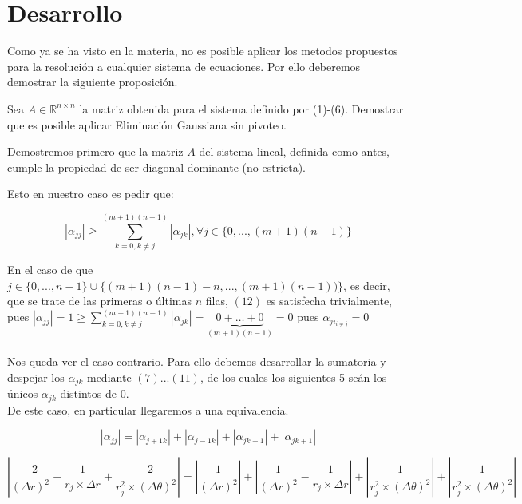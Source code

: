 \section{Desarrollo}

Como ya se ha visto en la materia, no es posible aplicar los metodos propuestos para la resoluci\'on a cualquier sistema de ecuaciones. Por ello deberemos demostrar la siguiente proposici\'on.

\begin{proposition}
Sea $A \in \mathbb{R}^{n \times n}$ la matriz obtenida para el sistema definido por (1)-(6). Demostrar que es posible
aplicar Eliminaci\'on Gaussiana sin pivoteo.
\end{proposition}

Demostremos primero que la matriz $A$ del sistema lineal, definida como antes, cumple la propiedad de ser diagonal dominante (no estricta).

Esto en nuestro caso es pedir que:

\begin{equation}
 \left | \alpha_{jj} \right | \geq \sum_{k=0,k \neq j}^{(m+1)(n-1)} \left | \alpha_{jk} \right |, \forall j \in \{ 0,...,(m+1)(n-1)\}
\end{equation}

En el caso de que $j \in \{0,...,n-1\} \cup \{(m+1)(n-1)-n,...,(m+1)(n-1))\}$, es decir, que se trate de las primeras o \'ultimas $n$ filas, $(12)$ es satisfecha trivialmente, pues  $\left | \alpha_{jj} \right | = 1 \geq \sum_{k=0,k \neq j}^{(m+1)(n-1)} \left | \alpha_{jk} \right | =  \underbrace{0+ \ldots +0}_{(m+1)(n-1)} = 0$ pues $\alpha_{ji_{i\neq j}}=0 $ 
\\
\\
Nos queda ver el caso contrario. Para ello debemos desarrollar la sumatoria y despejar los $\alpha_{jk}$ mediante $(7)...(11)$, de los cuales los siguientes 5 se\'an los \'unicos $\alpha_{jk}$ distintos de $0$.
\\
De este caso, en particular llegaremos a una equivalencia.

\begin{equation}
 \left | \alpha_{jj} \right | = \left | \alpha_{j+1k} \right | + \left | \alpha_{j-1k} \right | + \left | \alpha_{jk-1} \right | + \left | \alpha_{jk+1} \right |
\end{equation}

\begin{equation}
 \left | \frac{-2}{(\Delta r)^2} + \frac{1}{r_j \times \Delta r} + \frac{-2}{r_j^2 \times (\Delta \theta)^2} \right | = \left | \frac{1}{(\Delta r)^2} \right | + \left | \frac{1}{(\Delta r)^2} - \frac{1}{r_j \times \Delta r} \right | + \left | \frac{1}{r_j^2 \times (\Delta \theta)^2} \right | + \left | \frac{1}{r_j^2 \times (\Delta \theta)^2} \right |
\end{equation}

